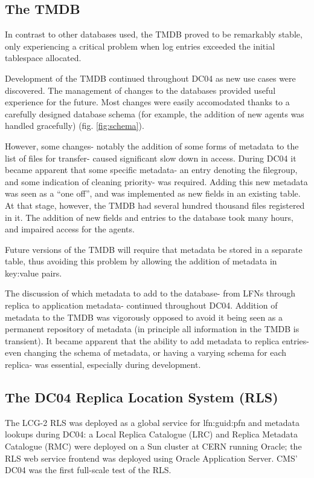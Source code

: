 \documentclass{cmspaper}
\begin{document}
\subsection{The TMDB}
In contrast to other databases used, the TMDB proved to be remarkably
stable, only experiencing a critical problem when log entries exceeded
the initial tablespace allocated.

Development of the TMDB continued throughout DC04 as new use cases
were discovered. The management of changes to the databases provided
useful experience for the future. Most changes were easily accomodated
thanks to a carefully designed database schema (for example, the
addition of new agents was handled gracefully)
(fig. \ref{fig:schema}).

However, some changes- notably the addition of some forms of metadata
to the list of files for transfer- caused significant slow down in
access. During DC04 it became apparent that some specific metadata- an
entry denoting the filegroup, and some indication of cleaning
priority- was required. Adding this new metadata was seen as a ``one
off'', and was implemented as new fields in an existing table. At that
stage, however, the TMDB had several hundred thousand files registered
in it. The addition of new fields and entries to the database took
many hours, and impaired access for the agents.

Future versions of the TMDB will require that metadata be stored in a
separate table, thus avoiding this problem by allowing the addition of
metadata in key:value pairs.

The discussion of which metadata to add to the database- from LFNs
through replica to application metadata- continued throughout
DC04. Addition of metadata to the TMDB was vigorously opposed to avoid
it being seen as a permanent repository of metadata (in principle all
information in the TMDB is transient). It became apparent that the
ability to add metadata to replica entries- even changing the schema
of metadata, or having a varying schema for each replica- was
essential, especially during development.

\subsection{The DC04 Replica Location System (RLS)}
The LCG-2 RLS was deployed as a global service for lfn:guid:pfn and
metadata lookups during DC04: a Local Replica Catalogue (LRC) and
Replica Metadata Catalogue (RMC) were deployed on a Sun cluster at
CERN running Oracle; the RLS web service frontend was deployed using
Oracle Application Server. CMS' DC04 was the first full-scale test of
the RLS.
\end{document}
